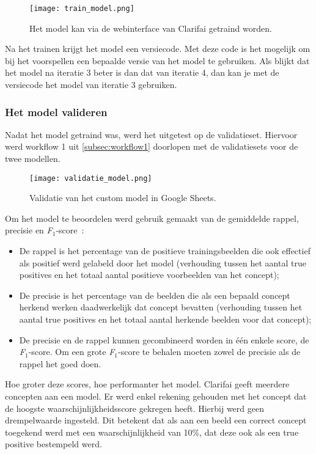 \begin{figure}[h]
	\centering
	\texttt{[image: train\_model.png]}\hfill
	\caption[Het model trainen via de webinterface]{Het model kan via de webinterface van Clarifai getraind worden.}
	\label{fig:model-trainen}
\end{figure}

Na het trainen krijgt het model een versiecode. Met deze code is het mogelijk om bij het voorspellen een bepaalde versie van het model te gebruiken. Als blijkt dat het model na iteratie 3 beter is dan dat van iteratie 4, dan kan je met de versiecode het model van iteratie 3 gebruiken.

\subsubsection{Het model valideren}
\label{subsubsec:model-valideren}

Nadat het model getraind was, werd het uitgetest op de validatieset. Hiervoor werd workflow 1 uit \ref{subsec:workflow1} doorlopen met de validatiesets voor de twee modellen.

\begin{figure}
	\centering
	\texttt{[image: validatie\_model.png]}\hfill
	\caption{Validatie van het custom model in Google Sheets.}
	\label{fig:validatie-model}
\end{figure}

Om het model te beoordelen werd gebruik gemaakt van de gemiddelde rappel, precisie en \textit{F$_{1}$}-score~\autocite{Lievens2017}:
\begin{itemize}
    \item De rappel is het percentage van de positieve trainingsbeelden die ook effectief als positief werd gelabeld door het model (verhouding tussen het aantal true positives en het totaal aantal positieve voorbeelden van het concept);
    \item De precisie is het percentage van de beelden die als een bepaald concept herkend werken daadwerkelijk dat concept bevatten (verhouding tussen het aantal true positives en het totaal aantal herkende beelden voor dat concept);
    \item De precisie en de rappel kunnen gecombineerd worden in één enkele score, de \textit{F$_{1}$}-score. Om een grote \textit{F$_{1}$}-score te behalen moeten zowel de precisie als de rappel het goed doen.
\end{itemize}

Hoe groter deze scores, hoe performanter het model. Clarifai geeft meerdere concepten aan een model. Er werd enkel rekening gehouden met het concept dat de hoogste waarschijnlijkheidsscore gekregen heeft. Hierbij werd geen drempelwaarde ingesteld. Dit betekent dat als aan een beeld een correct concept toegekend werd met een waarschijnlijkheid van 10\%, dat deze ook als een true positive bestempeld werd. 

